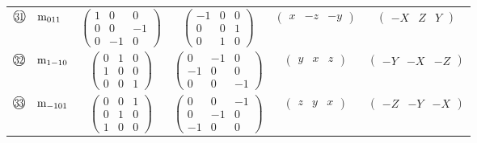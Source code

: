 \documentclass[fleqn,10pt,landscape]{jsarticle}
\begin{document}
\begin{center}
\begin{longtable}{lcccc}
$ {\ooalign{\hfil\resizebox{.8\width}{\height}{31}\hfil\crcr\raise.1ex\hbox{\large$\bigcirc$}}}\quad {\rm m}_{011} $ & $ \begin{pmatrix} 1 & 0 & 0 \\ 0 & 0 & -1 \\ 0 & -1 & 0 \end{pmatrix} $ & $ \begin{pmatrix} -1 & 0 & 0 \\ 0 & 0 & 1 \\ 0 & 1 & 0 \end{pmatrix} $ & $ \begin{pmatrix} x & - z & - y \end{pmatrix} $ & $ \begin{pmatrix} - X & Z & Y \end{pmatrix} $ \\
$ {\ooalign{\hfil\resizebox{.8\width}{\height}{32}\hfil\crcr\raise.1ex\hbox{\large$\bigcirc$}}}\quad {\rm m}_{1-10} $ & $ \begin{pmatrix} 0 & 1 & 0 \\ 1 & 0 & 0 \\ 0 & 0 & 1 \end{pmatrix} $ & $ \begin{pmatrix} 0 & -1 & 0 \\ -1 & 0 & 0 \\ 0 & 0 & -1 \end{pmatrix} $ & $ \begin{pmatrix} y & x & z \end{pmatrix} $ & $ \begin{pmatrix} - Y & - X & - Z \end{pmatrix} $ \\
$ {\ooalign{\hfil\resizebox{.8\width}{\height}{33}\hfil\crcr\raise.1ex\hbox{\large$\bigcirc$}}}\quad {\rm m}_{-101} $ & $ \begin{pmatrix} 0 & 0 & 1 \\ 0 & 1 & 0 \\ 1 & 0 & 0 \end{pmatrix} $ & $ \begin{pmatrix} 0 & 0 & -1 \\ 0 & -1 & 0 \\ -1 & 0 & 0 \end{pmatrix} $ & $ \begin{pmatrix} z & y & x \end{pmatrix} $ & $ \begin{pmatrix} - Z & - Y & - X \end{pmatrix} $ \\

\end{longtable}
\end{center}
\end{document}
